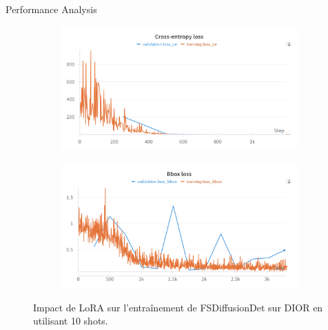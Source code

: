 \begin{subsectionframemod}{Performance Analysis}
\begin{figure}[h]
\begin{subfigure}{0.3\textwidth}
        \end{subfigure}
        \begin{subfigure}{0.3\textwidth}
            \includegraphics[width=\textwidth]{Figures/lora4.png}
        \end{subfigure}
        \begin{subfigure}{0.3\textwidth}
            \includegraphics[width=\textwidth]{Figures/lora5.png}
        \end{subfigure}
        \caption{Impact de LoRA sur l'entraînement de FSDiffusionDet sur DIOR en utilisant 10 shots.}
        \label{fig:lora_curves}
    \end{figure}
\end{subsectionframemod}